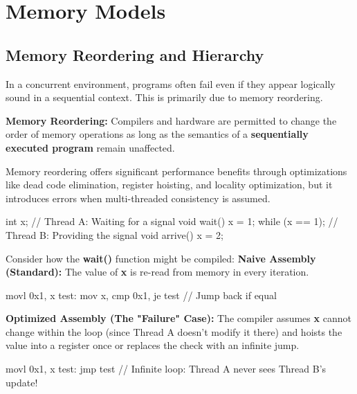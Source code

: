 \section{Memory Models}

\subsection{Memory Reordering and Hierarchy}

\begin{remark}
    In a concurrent environment, programs often fail even if they appear logically sound in a sequential context. This is primarily due to memory reordering.
\end{remark}

\begin{definition}
    \textbf{Memory Reordering: } Compilers and hardware are permitted to change the order of memory operations as long as the semantics of a \textbf{sequentially executed program} remain unaffected.
\end{definition}

\begin{remark}
    Memory reordering offers significant performance benefits through optimizations like dead code elimination, register hoisting, and locality optimization, but it introduces errors when multi-threaded consistency is assumed.
\end{remark}

\begin{codeexample}
int x;
// Thread A: Waiting for a signal
void wait() { 
    x = 1; 
    while (x == 1); 
}
// Thread B: Providing the signal
void arrive() { 
    x = 2; 
}
\end{codeexample}

Consider how the \textbf{wait()} function might be compiled:
\textbf{Naive Assembly (Standard):} The value of \textbf{x} is re-read from memory in every iteration.

\begin{codeexample}
movl 0x1, x  
test:
mov x, %
cmp 0x1, %
je test        // Jump back if equal
\end{codeexample}

\textbf{Optimized Assembly (The "Failure" Case):} The compiler assumes \textbf{x} cannot change within the loop (since Thread A doesn't modify it there) and hoists the value into a register once or replaces the check with an infinite jump.

\begin{codeexample}
movl 0x1, x
test:
jmp test       // Infinite loop: Thread A never sees Thread B's update!
\end{codeexample}

